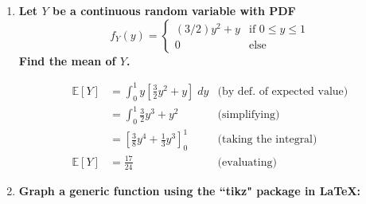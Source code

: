 \documentclass{article}
\begin{document}
\begin{enumerate}
	We don't have to go through all of the possible combinations of binding/non-binding constraints
	if we use a little economic intution:
	\begin{itemize}
	\item The utility function is strictly increasing, so $M=p_1x_1+p_2x_2$
	\item $\ln(x_1)\rightarrow-\infty$ as $x\rightarrow 0$, so $x_1>0$
	\end{itemize}

	Thus, there are only two potential solutions. Assuming positive consumption of both goods
	(only the budget constraint binds):
	\begin{align*}
		0 & = \frac{\alpha}{x_1}-p_1\lambda
				&\text{(from the first FOC)}\\
		0 & = 1-p_2\lambda
				&\text{(from the second FOC)}\\[5pt]
		M & = p_1x_1+p_2x_2
				&\text{(from the third FOC)}
	\intertext{Manipulating the first two FOCs:}
		\frac{1}{p_2} & = \frac{\alpha}{p_1x_1}
				&\text{(combining the 1st two FOCs)}\\
		\Aboxed{x_1^* & = \alpha\left(\frac{p_2}{p_1}\right)}
				&\text{(solving for $x_1$)}
	\end{align*}
	(etc., etc.)



\item\textbf{Let $Y$ be a continuous random variable with PDF
	\[f_{Y}(y)=\begin{cases}
			(3/2)y^2+y&\text{if }0\leq y\leq 1 \\[5pt]
			0 &\text{else}
			\end{cases}\]
	Find the mean of $Y$.}
	
	\begin{align*}
		\mathbb{E}[Y]&=\int_0^1y\left[\frac{3}{2}y^2+y\right]\;dy
				&\text{(by def. of expected value)}\\[4pt]
		&=\int_0^1\frac{3}{2}y^3+y^2
				&\text{(simplifying)}\\[4pt]
		& = \left[\frac{3}{8}y^4+\frac{1}{3}y^3\right]_0^1
				&\text{(taking the integral)}\\[4pt]
		\mathbb{E}[Y]& = \frac{17}{24}
				&\text{(evaluating)}
	\end{align*}



\item\textbf{Graph a generic function using the ``tikz" package in LaTeX:}
	\begin{center}
	\end{center}



\end{enumerate}
\end{document}

